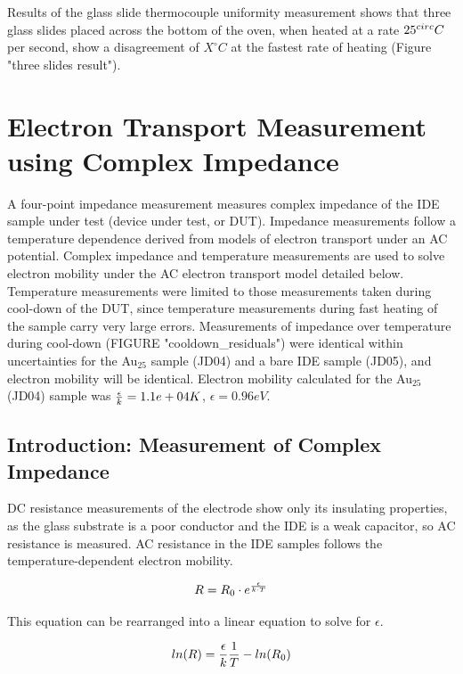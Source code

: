 \documentclass[12pt,oneside,english]{article}
\begin{document}
Results of the glass slide thermocouple uniformity measurement shows that three glass slides placed across the bottom of the oven, when heated at a rate $25^{\/circ}C$ per second, show a disagreement of $X^{\circ}C$ at the fastest rate of heating (Figure "three slides result").


	
	
	\section{Electron Transport Measurement using Complex Impedance}
	A four-point impedance measurement measures complex impedance of the IDE sample under test (device under test, or DUT).  
Impedance measurements follow a temperature dependence derived from models of electron transport under an AC potential.  
Complex impedance and temperature measurements are used to solve electron mobility under the AC electron transport model detailed below.  
Temperature measurements were limited to those measurements taken during cool-down of the DUT, since temperature measurements during fast heating of the sample carry very large errors.  
Measurements of impedance over temperature during cool-down (FIGURE "cooldown\_residuals") were identical within uncertainties for the Au$_25$ sample (JD04) and a bare IDE sample (JD05), and electron mobility will be identical.  
Electron mobility calculated for the Au$_25$ (JD04) sample was ${\epsilon\over{k}} = 1.1e+04 K$, $\epsilon = 0.96 eV$.
		
	\subsection{Introduction: Measurement of Complex Impedance} 
	DC resistance measurements of the electrode show only its insulating properties, as the glass substrate is a poor conductor and the IDE is a weak capacitor, so AC resistance is measured.
	AC resistance in the IDE samples follows the temperature-dependent electron mobility.
	
	\begin{equation}
		R = R_0 \cdot e^{\epsilon\over{k \cdot T}}
		\label{eq:emobility}
	\end{equation}
	
	This equation can be rearranged into a linear equation to solve for $\epsilon$.
	
	\begin{equation}
		ln(R) = {\epsilon\over{k}} {1\over{T}} - ln(R_0)
		\label{eq:solve_emobility}
	\end{equation}
	
\end{document}
